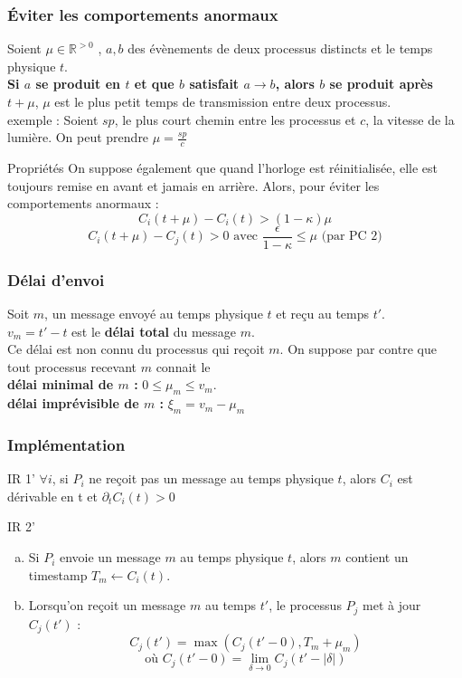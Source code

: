 \documentclass[compress]{beamer}
\begin{document}
\begin{frame}
\frametitle{\'Eviter les comportements anormaux}
Soient $\mu \in \mathbb{R}^{> 0}$ , $a, b$ des évènements de deux processus distincts et le temps physique $t$.\\
\textbf{Si $a$ se produit en $t$ et que $b$ satisfait {\color{cyan}$a \rightarrow b$}, alors $b$ se produit après {\color{cyan}$t + \mu$}}, $\mu$ est le plus petit temps de transmission entre deux processus.\\
exemple : Soient $sp$, le plus court chemin entre les processus et $c$, la vitesse de la lumière. On peut prendre $\mu = \frac{sp}{c}$
\begin{block}{Propriétés}
On suppose également que quand l'horloge est réinitialisée, elle est toujours remise en avant et jamais en arrière. Alors, pour éviter les comportements anormaux :
\[ C_i(t+\mu) - C_i(t) > (1 - \kappa)\mu\]
\[ C_i(t+\mu) - C_j(t) > 0 \text{ avec } \frac{\epsilon}{1-\kappa} \leq \mu \text{ (par PC 2)} \]
\end{block}
\end{frame}

\begin{frame}
\frametitle{Délai d'envoi}
Soit $m$, un message envoyé au temps physique $t$ et reçu au temps $t'$.\\
{\color{cyan}$v_m = t' - t$} est le \textbf{\color{cyan}délai total} du message $m$.\\
Ce délai est non connu du processus qui reçoit $m$. On suppose par contre que tout processus recevant $m$ connait le\\ \textbf{\color{cyan} délai minimal de $m$ : } $0 \leq \mu_m \leq v_m$. \\
\textbf{\color{cyan} délai imprévisible de $m$ : }$\xi_m = v_m - \mu_m$
\end{frame}

\begin{frame}
\frametitle{Implémentation}
\begin{block}{IR 1'}
$\forall i$, si $P_i$ ne reçoit pas un message au temps physique $t$, alors $C_i$ est dérivable en t et $\partial_t C_i (t) > 0$
\end{block}

\begin{block}{IR 2'}
\begin{enumerate}[(a)]
\item Si $P_i$ envoie un message $m$ au temps physique $t$, alors $m$ contient un timestamp $T_m \leftarrow C_i(t)$.
\item Lorsqu'on reçoit un message $m$ au temps $t'$, le processus $P_j$ met à jour $C_j(t')$ : 
\[C_j(t') = \max (C_j(t'-0), T_m + \mu_m)\]\[\text{où } C_j(t'-0) = \lim_{\delta \rightarrow 0} C_j(t' - |\delta|)\]
\end{enumerate}
\end{block}

\end{frame}
\end{document}
